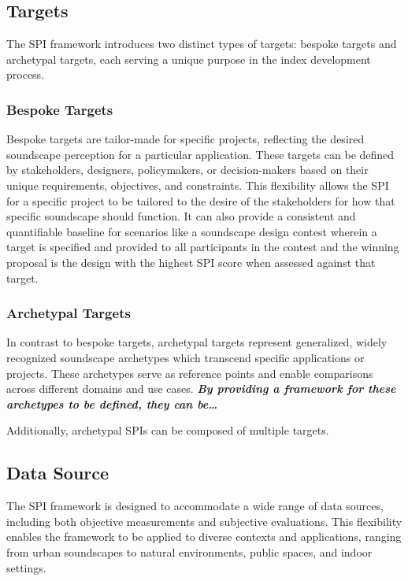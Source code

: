 \documentclass[
  authoryear,
  preprint,
  3p]{elsarticle}
\begin{document}
\subsection{Targets}\label{targets}

The SPI framework introduces two distinct types of targets: bespoke
targets and archetypal targets, each serving a unique purpose in the
index development process.

\subsubsection{Bespoke Targets}\label{bespoke-targets}

Bespoke targets are tailor-made for specific projects, reflecting the
desired soundscape perception for a particular application. These
targets can be defined by stakeholders, designers, policymakers, or
decision-makers based on their unique requirements, objectives, and
constraints. This flexibility allows the SPI for a specific project to
be tailored to the desire of the stakeholders for how that specific
soundscape should function. It can also provide a consistent and
quantifiable baseline for scenarios like a soundscape design contest
wherein a target is specified and provided to all participants in the
contest and the winning proposal is the design with the highest SPI
score when assessed against that target.

\subsubsection{Archetypal Targets}\label{archetypal-targets}

In contrast to bespoke targets, archetypal targets represent
generalized, widely recognized soundscape archetypes which transcend
specific applications or projects. These archetypes serve as reference
points and enable comparisons across different domains and use cases.
\textbf{\emph{By providing a framework for these archetypes to be
defined, they can be\ldots{}}}

Additionally, archetypal SPIs can be composed of multiple targets.

\subsection{Data Source}\label{data-source}

The SPI framework is designed to accommodate a wide range of data
sources, including both objective measurements and subjective
evaluations. This flexibility enables the framework to be applied to
diverse contexts and applications, ranging from urban soundscapes to
natural environments, public spaces, and indoor settings.
\end{document}

